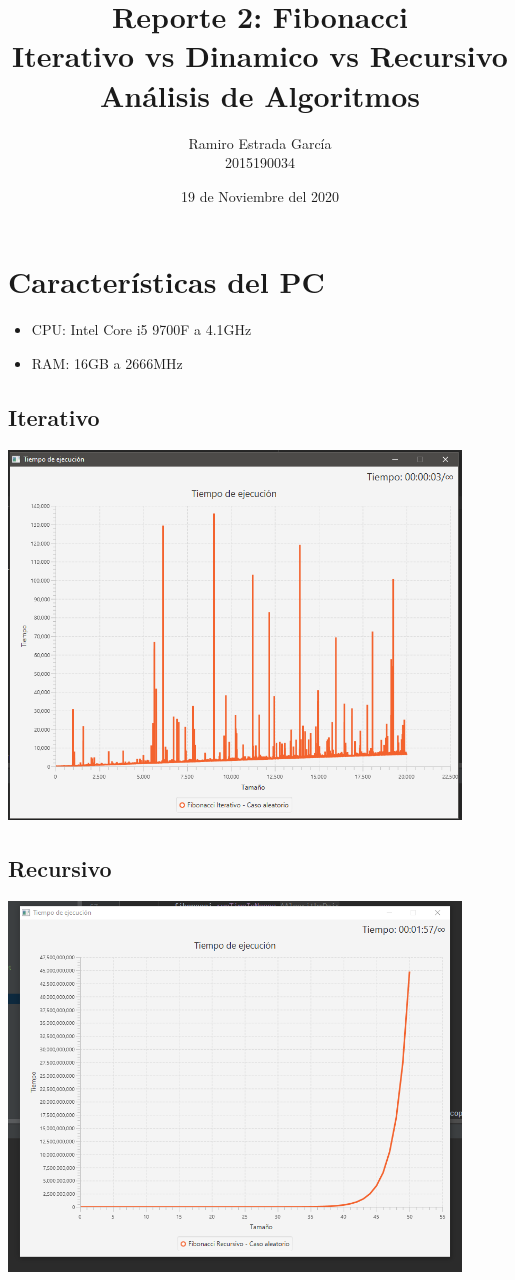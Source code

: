 \documentclass{article}
\title{Reporte 2: Fibonacci\\Iterativo vs Dinamico vs Recursivo\\\textbf{Análisis de Algoritmos}}
\author{ Ramiro Estrada García\\2015190034 }
\date{19 de Noviembre del 2020}
\begin{document}
\maketitle
\vspace{5cm}
\section {Características del PC}
\begin{itemize}
	\item CPU: Intel Core i5 9700F a 4.1GHz
	\item RAM: 16GB a 2666MHz
\end{itemize}
\newpage
\maketitle
\subsection{Iterativo}
\includegraphics[width=12cm]{iterativo.png}\\
\subsection{Recursivo}
\includegraphics[width=12cm]{recursivo.png}\\
\end{document}
